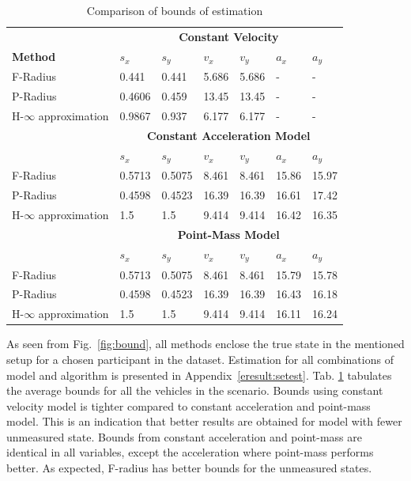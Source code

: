 \begin{table}[htbp]
\caption{Comparison of bounds of estimation\\}
	\centering
	\renewcommand{\arraystretch}{1.1}
	\small	
	\begin{tabular}{l l l l l l l}
		\toprule 
		& \multicolumn{6}{c}{\textbf{Constant Velocity}}\\
		\textbf{Method} & \textbf{$s_x$} & \textbf{$s_y$} & \textbf{$v_x$} & \textbf{$v_y$} & \textbf{$a_x$} & \textbf{$a_y$}\\ \midrule
		F-Radius & 0.441 & 0.441 & 5.686 & 5.686 & - & -\\
		P-Radius & 0.4606 & 0.459 & 13.45 & 13.45 & - &	-\\
		H-$\infty$ approximation & 0.9867 &	0.937 &	6.177 & 6.177 & - &-\\
		
		& \multicolumn{6}{c}{\textbf{Constant Acceleration Model}}\\
		 & \textbf{$s_x$} & \textbf{$s_y$} & \textbf{$v_x$} & \textbf{$v_y$} & \textbf{$a_x$} & \textbf{$a_y$}\\ \midrule
		F-Radius & 0.5713 &	0.5075 &	8.461	& 8.461 &	15.86 &	15.97\\
		P-Radius & 0.4598 &	0.4523 &	16.39 &	16.39 &	16.61 &	17.42\\
		H-$\infty$ approximation & 1.5 & 1.5 & 9.414 &	9.414 &	16.42 &	16.35\\
		
		& \multicolumn{6}{c}{\textbf{Point-Mass Model}}\\
		 & \textbf{$s_x$} & \textbf{$s_y$} & \textbf{$v_x$} & \textbf{$v_y$} & \textbf{$a_x$} & \textbf{$a_y$}\\ \midrule
		F-Radius & 0.5713 &	0.5075 &	8.461	& 8.461 &	15.79 &	15.78\\
		P-Radius & 0.4598 &	0.4523 &	16.39 &	16.39 &	16.43 &	16.18\\
		H-$\infty$ approximation & 1.5 & 1.5 & 9.414 &	9.414 &	16.11 &	16.24\\
		\bottomrule
	\end{tabular}
	\label{tab:bound}
\end{table}
As seen from Fig.~\ref{fig:bound}, all methods enclose the true state in the mentioned setup for a chosen participant in the dataset. Estimation for all combinations of model and algorithm is presented in Appendix~\ref{eresult:setest}. 
Tab. \ref{tab:bound} tabulates the average bounds for all the vehicles in the scenario. Bounds using constant velocity model is tighter compared to constant acceleration and point-mass model. This is an indication that better results are obtained for model with fewer unmeasured state. Bounds from constant acceleration and point-mass are identical in all variables, except the acceleration where point-mass performs better. As expected, F-radius has better bounds for the unmeasured states. 

